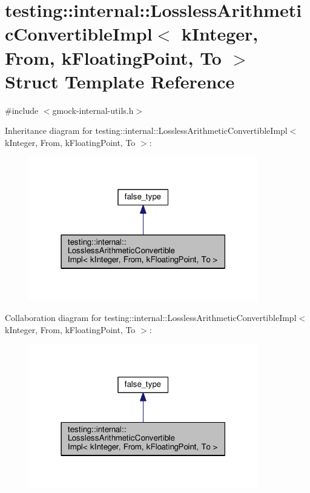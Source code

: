 \hypertarget{structtesting_1_1internal_1_1LosslessArithmeticConvertibleImpl_3_01kInteger_00_01From_00_01kFloatingPoint_00_01To_01_4}{}\section{testing\+:\+:internal\+:\+:Lossless\+Arithmetic\+Convertible\+Impl$<$ k\+Integer, From, k\+Floating\+Point, To $>$ Struct Template Reference}
\label{structtesting_1_1internal_1_1LosslessArithmeticConvertibleImpl_3_01kInteger_00_01From_00_01kFloatingPoint_00_01To_01_4}


{\ttfamily \#include $<$gmock-\/internal-\/utils.\+h$>$}



Inheritance diagram for testing\+:\+:internal\+:\+:Lossless\+Arithmetic\+Convertible\+Impl$<$ k\+Integer, From, k\+Floating\+Point, To $>$\+:\nopagebreak
\begin{figure}[H]
\begin{center}
\leavevmode
\includegraphics[width=283pt]{structtesting_1_1internal_1_1LosslessArithmeticConvertibleImpl_3_01kInteger_00_01From_00_01kFloa97ddcd9ae12df44342db9501f8d5ac86}
\end{center}
\end{figure}


Collaboration diagram for testing\+:\+:internal\+:\+:Lossless\+Arithmetic\+Convertible\+Impl$<$ k\+Integer, From, k\+Floating\+Point, To $>$\+:\nopagebreak
\begin{figure}[H]
\begin{center}
\leavevmode
\includegraphics[width=283pt]{structtesting_1_1internal_1_1LosslessArithmeticConvertibleImpl_3_01kInteger_00_01From_00_01kFloab2f8977d4fb612cb1a7b9a19e9be6516}
\end{center}
\end{figure}
